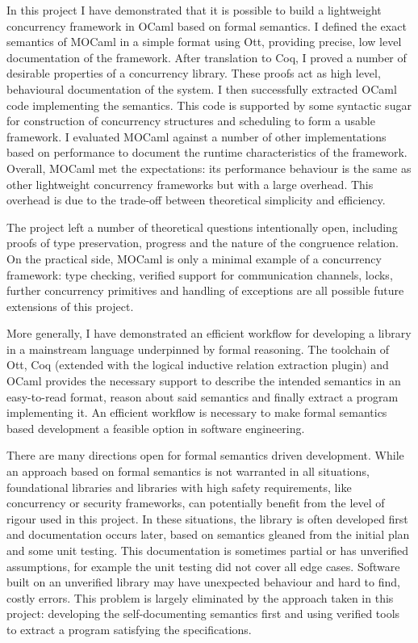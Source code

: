 \documentclass[12pt,twoside,notitlepage]{report}
\theoremstyle{plain}%
\theoremstyle{definition}
\theoremstyle{remark}
\begin{document}

In this project I have demonstrated that it is possible to build a lightweight concurrency framework in OCaml based on formal semantics. I defined the exact semantics of MOCaml in a simple format using Ott, providing precise, low level documentation of the framework. After translation to Coq, I proved a number of desirable properties of a concurrency library. These proofs act as high level, behavioural documentation of the system. I then successfully extracted OCaml code implementing the semantics. This code is supported by some syntactic sugar for construction of concurrency structures and scheduling to form a usable framework. I evaluated MOCaml against a number of other implementations based on performance to document the runtime characteristics of the framework. Overall, MOCaml met the expectations: its performance behaviour is the same as other lightweight concurrency frameworks but with a large overhead. This overhead is due to the trade-off between theoretical simplicity and efficiency.




The project left a number of theoretical questions intentionally open, including proofs of type preservation, progress and the nature of the congruence relation. On the practical side, MOCaml is only a minimal example of a concurrency framework: type checking, verified support for communication channels, locks, further concurrency primitives and handling of exceptions are all possible future extensions of this project. 



More generally, I have demonstrated an efficient workflow for developing a library in a mainstream language underpinned by formal reasoning. The toolchain of Ott, Coq (extended with the logical inductive relation extraction plugin) and OCaml  provides the necessary support to describe the intended semantics in an easy-to-read format, reason about said semantics and finally extract a program implementing it. An efficient workflow is necessary to make formal semantics based development a feasible option in software engineering.


There are many directions open for formal semantics driven development. While an approach based on formal semantics is not warranted in all situations, foundational libraries and libraries with high safety requirements, like concurrency or security frameworks, can potentially benefit from the level of rigour used in this project. In these situations, the library is often developed first and documentation occurs later, based on semantics gleaned from the initial plan and some unit testing. This documentation is sometimes partial or has unverified assumptions, for example the unit testing did not cover all edge cases. Software built on an unverified library may have unexpected behaviour and hard to find, costly errors. This problem is largely eliminated by the approach taken in this project: developing the self-documenting semantics first and using verified tools to extract a program satisfying the specifications.
\end{document}
